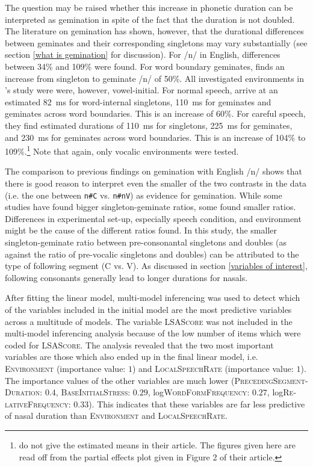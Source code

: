 The question may be raised whether this increase in phonetic duration can be interpreted as gemination in spite of the fact that the duration is not doubled. The literature on gemination has shown, however, that the durational differences between geminates and their corresponding singletons may vary substantially (see section \ref{what is gemination} for discussion). 
For /n/ in English, differences between 34\% and 109\% were found. For word boundary geminates, \cite{Delattre.} finds  an increase from singleton to geminate /n/ of 50\%.  All investigated environments in \citeauthor{Delattre.}'s study were were, however, vowel-initial.  For normal speech, \citet[86, Figure 2]{Oh.2012} arrive at an estimated 82~ms for word-internal singletons, 110~ms for geminates and geminates across word boundaries. This is an increase of 60\%. For careful speech, they find estimated durations of 110~ms for singletons, 225~ms for geminates, and 230~ms for geminates across word boundaries. This is an increase of 104\% to 109\%.\footnote{\citet{Oh.2012} do not give the estimated means in their article. The figures given here are read off from the partial effects plot given in Figure 2 of their article.} Note that again, only vocalic environments were tested.

The comparison to previous findings on gemination with English /n/ shows that there is good reason to interpret even the smaller of the two contrasts in the data (i.e. the one between \texttt{n\#C} vs. \texttt{n\#nV}) as evidence for gemination. While some studies have found bigger singleton-geminate ratios, some found smaller ratios. Differences in experimental set-up, especially speech condition, and  environment might be the cause of the different ratios found. In this study, the smaller singleton-geminate ratio between pre-consonantal singletons and doubles  (as against the ratio of pre-vocalic singletons and doubles) can be attributed to the type of following segment (C vs. V). As discussed in section \ref{variables of interest}, following consonants generally lead to longer durations for nasals.

After fitting the linear model, multi-model inferencing was used to detect which of the variables included in the initial model are the most predictive variables across a multitude of models. The variable \textsc{LSAScore} was not included in the multi-model inferencing analysis because of the low number of items which were coded for \textsc{LSAScore}. 
The analysis revealed that the two most important variables are those which also ended up in the final linear model, i.e. \textsc{Environment} (importance value: $1$) and \textsc{LocalSpeechRate} (importance value: $1$).  The importance values of the other variables are much lower (\textsc{PrecedingSegment-Duration}:  $0.4$, \textsc{BaseInitialStress}: $0.29$, log\textsc{WordFormFrequency}: $0.27$, log\textsc{Re-lativeFrequency}: $0.33$). This indicates that these variables are far less predictive of nasal duration than \textsc{Environment} and \textsc{LocalSpeechRate}. 


